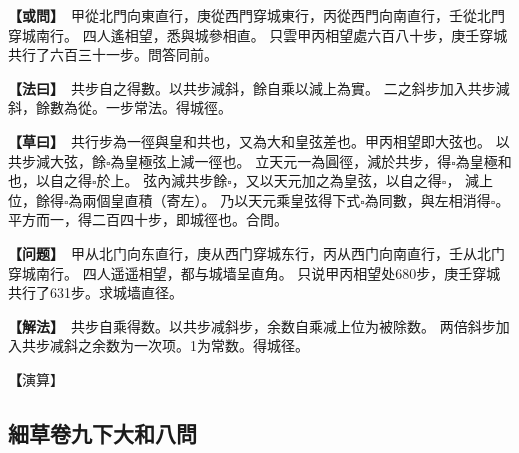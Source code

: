 \documentclass[11pt,a4paper]{article}
\let\origsquare\square
\renewcommand{\square}{\ensuremath{\origsquare}}%
\newcommand{\clOWEN}[1]{%
  \par\vspace{0.3em}%
  \noindent\textcolor{problemcolor}{\textbf{【或問】}}\,{\tradfont #1}\par\nopagebreak%
}
\newcommand{\mdOWEN}[1]{%
  \par\vspace{0.3em}%
  \noindent\textcolor{problemcolor}{\textbf{【问题】}}\,{\modfont #1}\par\nopagebreak%
}
\newcommand{\clFAYUE}[1]{%
  \par\noindent\textcolor{methodcolor}{\textbf{【法曰】}}\,{\tradfont #1}\par\nopagebreak%
}
\newcommand{\mdFAYUE}[1]{%
  \par\noindent\textcolor{methodcolor}{\textbf{【解法】}}\,{\modfont #1}\par\nopagebreak%
}
\newcommand{\clTSAOYUE}[1]{%
  \par\noindent\textcolor{workcolor}{\textbf{【草曰】}}\,{\tradfont #1}\par%
}
\newcommand{\mdTSAOYUE}[1]{%
  \par\noindent\textcolor{workcolor}{\textbf【演算】}}\,{\modfont #1}\par%
\begin{document}
\begin{paracol}{2}

\begin{leftcolumn}
\clOWEN{%
甲從北門向東直行，庚從西門穿城東行，丙從西門向南直行，壬從北門穿城南行。
四人遙相望，悉與城參相直。
只雲甲丙相望處六百八十步，庚壬穿城共行了六百三十一步。問答同前。}

\clFAYUE{%
共步自之得數。以共步減斜，餘自乘以減上為實。
二之斜步加入共步減斜，餘數為從。一步常法。得城徑。}

\clTSAOYUE{%
共行步為一徑與皇和共也，又為大和皇弦差也。甲丙相望即大弦也。
以共步減大弦，餘$\square$為皇極弦上減一徑也。
立天元一為圓徑，減於共步，得$\square$為皇極和也，以自之得$\square$於上。
弦內減共步餘$\square$，又以天元加之為皇弦，以自之得$\square$，
減上位，餘得$\square$為兩個皇直積（寄左）。
乃以天元乘皇弦得下式$\square$為同數，與左相消得$\square$。
平方而一，得二百四十步，即城徑也。合問。}
\end{leftcolumn}

\switchcolumn

\begin{rightcolumn}
\mdOWEN{%
甲从北门向东直行，庚从西门穿城东行，丙从西门向南直行，壬从北门穿城南行。
四人遥遥相望，都与城墙呈直角。
只说甲丙相望处680步，庚壬穿城共行了631步。求城墙直径。}

\mdFAYUE{%
共步自乘得数。以共步减斜步，余数自乘减上位为被除数。
两倍斜步加入共步减斜之余数为一次项。1为常数。得城径。}

\mdTSAOYUE{%
共行步为一径与皇极之和，又为大和与皇弦之差。甲丙相望即大弦。
以共步减大弦余$\square$为皇极弦上减一径。
设天元一为圆径，从共步中减去得$\square$为皇极和，自乘得$\square$于上位。
弦内减共步余$\square$，再加天元为皇弦，自乘得$\square$，
减上位余得$\square$为两个皇极直积（寄左）。
以天元乘皇弦得下式$\square$为同数，与左式相消得$\square$。
开平方得240步，即城径。符合所问。}
\end{rightcolumn}

\end{paracol}

\newpage

\subsection{\tradfont 細草卷九下\quad 大和八問}

\begin{center}
\end{center}
\end{document}
